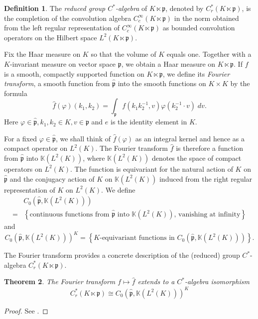 \documentclass{amsproc}
\newtheorem{theorem}{Theorem}[section]
\theoremstyle{definition}
\newtheorem{definition}[theorem]{Definition}
\theoremstyle{remark}
\numberwithin{equation}{section}
\newcommand{\kp}{\mathfrak{p}}
\begin{document}
\begin{definition}
The \emph{reduced group $C^*$-algebra} of $K \ltimes \kp$, denoted by $C^*_r(K \ltimes \kp)$, is the completion of the convolution algebra $C_c^\infty(K \ltimes \kp)$ in the norm obtained from the left regular representation of $C_c^\infty(K \ltimes \kp)$ as bounded convolution operators on the Hilbert space $L^2(K \ltimes \kp)$. 
\end{definition}


Fix the Haar measure on $K$ so that the volume of $K$ equals one. Together with a $K$-invariant measure on vector space $\kp$, we obtain a Haar measure on $K \ltimes \kp$. If $f$ is a smooth, compactly supported function on $ K \ltimes \kp$, we define its \emph{Fourier transform}, a smooth function from $\widehat{\kp}$ into the smooth functions on $K \times K$ by the formula
\[
\widehat{f}(\varphi) (k_1, k_2) = \int_\kp f(k_1 k_2^{-1},  v) \varphi(k_2^{-1}\cdot v) \; dv.
\]
Here $\varphi \in \widehat{\kp}, k_1, k_2 \in K, v \in \kp$ and $e$ is the identity element in $K$. 

For a fixed $\varphi \in \widehat{\kp}$, we shall think of $\widehat{f}(\varphi)$ as an integral kernel and hence as a compact operator on $L^2(K)$. The Fourier transform $\widehat{f}$ is therefore a function from $\widehat{\kp}$ into $\mathbb{K}\left(L^2(K)\right)$, where $\mathbb{K}\left(L^2(K)\right)$ denotes the space of compact operators on $L^2(K)$. The function is equivariant for the natural action of $K$ on $\widehat{\kp}$ and the conjugacy action of $K$ on $\mathbb{K}\left(L^2(K)\right)$ induced from the right regular representation of $K$ on $L^2(K)$. We define
\[
\begin{aligned}
&C_0\left(\widehat{\kp}, \mathbb{K}\left(L^2(K)\right)\right)\\
 =& \left\{ \text{continuous functions from $\widehat{\kp}$ into $\mathbb{K}\left(L^2(K)\right)$,  vanishing at infinity} \right\}
\end{aligned}
\]
and 
\[
C_0\left(\widehat{\kp}, \mathbb{K}\left(L^2(K)\right)\right)^K = \left\{\text{$K$-equivariant functions in $C_0\left(\widehat{\kp}, \mathbb{K}\left(L^2(K)\right)\right)$} \right\}.
\]

The Fourier transform provides a concrete description of the  (reduced) group $C^*$-algebra $C^*_r(K\ltimes \mathfrak{p})$.
\begin{theorem}
The Fourier transform $f \mapsto \widehat{f}$ extends to a $C^*$-algebra isomorphism 	
\[
C_r^*(K \ltimes \kp)  \cong C_0\left(\widehat{\kp}, \mathbb{K}\left(L^2(K)\right)\right)^K
\]
\end{theorem}
\begin{proof}
See \cite[Theorem 3.2]{higson-mackey}.	
\end{proof}
\end{document}
